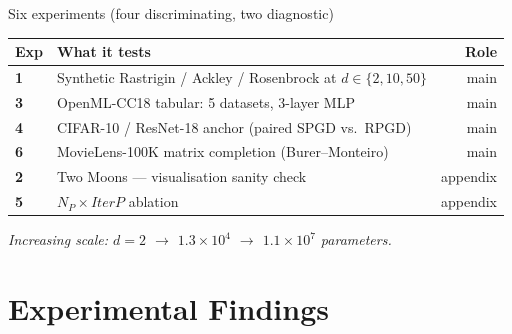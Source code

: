 \documentclass[11pt,aspectratio=169]{beamer}
\newcommand{\np}{\ensuremath{N_P}}
\newcommand{\iterp}{\ensuremath{\textit{IterP}}}
\begin{document}
\begin{frame}{Six experiments (four discriminating, two diagnostic)}
  \small
  \begin{tabularx}{\textwidth}{>{\bfseries}l X r}
    \toprule
    \textbf{Exp} & \textbf{What it tests} & \textbf{Role} \\
    \midrule
    1 & Synthetic Rastrigin / Ackley / Rosenbrock at $d \in \{2,10,50\}$  & main \\
    3 & OpenML-CC18 tabular: 5 datasets, 3-layer MLP                       & main \\
    4 & \alert{CIFAR-10 / ResNet-18 anchor} (paired SPGD vs.\ RPGD)        & main \\
    6 & MovieLens-100K matrix completion (Burer--Monteiro)                 & main \\
    \midrule
    2 & Two Moons --- visualisation sanity check                           & appendix \\
    5 & $\np \times \iterp$ ablation                                       & appendix \\
    \bottomrule
  \end{tabularx}

  \vspace{0.7em}
  \emph{Increasing scale: $d=2$ \;$\to$\; $1.3{\times}10^{4}$ \;$\to$\;
        $1.1{\times}10^{7}$ parameters.}
\end{frame}


\section{Experimental Findings}
\end{document}
